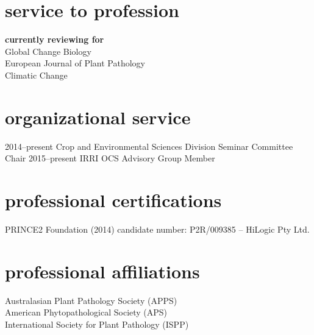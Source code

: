         \section*{service to profession}
        \textbf{currently reviewing for}\\
        Global Change Biology\\
        European Journal of Plant Pathology\\
        Climatic Change\\
        
      \section*{organizational service}
        \begin{entrylist}
          \entry
        	{2014--present}
        	{Crop and Environmental Sciences Division Seminar Committee Chair}
        	{}
        	{}
	      \entry  
	        {2015--present}
        	{IRRI OCS Advisory Group Member}
        	{}
        	{}
        \end{entrylist}
        \section*{professional certifications}
        PRINCE2 Foundation (2014) candidate number: P2R/009385 – HiLogic Pty Ltd.
        
        \section*{professional affiliations}
        Australasian Plant Pathology Society (APPS)\\
        American Phytopathological Society (APS)\\
        International Society for Plant Pathology (ISPP)\\
